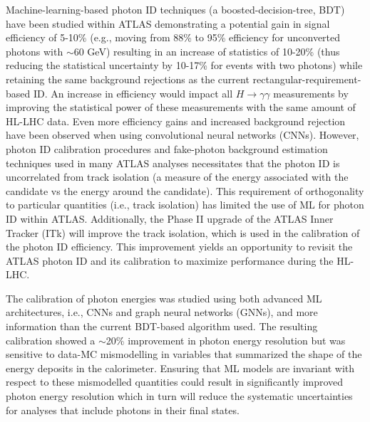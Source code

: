 \documentclass[letter, USenglish, 11pt, subfigure]{article}
\begin{document}
Machine-learning-based photon ID techniques (a boosted-decision-tree, BDT) have been studied within ATLAS demonstrating a potential gain in signal efficiency of 5-10\% (e.g., moving from 88\% to 95\% efficiency for unconverted photons with \pt$\sim$60 GeV) resulting in an increase of statistics of 10-20\% (thus reducing the statistical uncertainty by 10-17\% for events with two photons) while retaining the same background rejections as the current rectangular-requirement-based ID. An increase in efficiency would impact all $H\to\gamma\gamma$ measurements by improving the statistical power of these measurements with the same amount of HL-LHC data. Even more efficiency gains and increased background rejection have been observed when using convolutional neural networks (CNNs). However, photon ID calibration procedures and fake-photon background estimation techniques used in many ATLAS analyses necessitates that the photon ID is uncorrelated from track isolation (a measure of the energy associated with the candidate vs the energy around the candidate). This requirement of orthogonality to particular quantities (i.e., track isolation) has limited the use of ML for photon ID within ATLAS. Additionally, the Phase II upgrade of the ATLAS Inner Tracker (ITk) will improve the track isolation, which is used in the calibration of the photon ID efficiency. This improvement yields an opportunity to revisit the ATLAS photon ID and its calibration to maximize performance during the HL-LHC. 

The calibration of photon energies was studied using both advanced ML architectures, i.e., CNNs and graph neural networks (GNNs), and more information than the current BDT-based algorithm used. The resulting calibration showed a $\sim$20\% improvement in photon energy resolution but was sensitive to data-MC mismodelling in variables that summarized the shape of the energy deposits in the calorimeter. Ensuring that ML models are invariant with respect to these mismodelled quantities could result in significantly improved photon energy resolution which in turn will reduce the systematic uncertainties for analyses that include photons in their final states.
\end{document}
